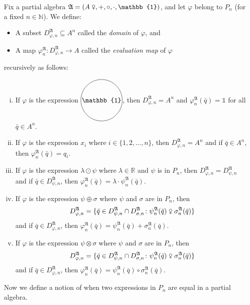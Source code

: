 \documentclass{scrartcl}
\renewcommand{\phi}{\varphi}
\newcommand{\FA}{\mathfrak{A}}
\newcommand{\BR}{\mathbb{R}}
\newcommand{\com}{\mathrel{\venus}}
\newcommand*\circled[1]{\tikz[baseline=(char.base)]{
  \node[shape=circle,draw,inner sep=1pt] (char) {#1};}}
\newcommand{\circone}{\circled{$\mathbb{1}$}}
\begin{document}
\begin{definition}
Fix a partial algebra $\FA=(A\com,+,\circ,\cdot,\mathbb{1})$, and let $\phi$ belong to $P_n$ (for a fixed $n\in\mathbb{N}$). We define:
\begin{itemize}
\item
A subset $D_{\phi,n}^{\FA}\subseteq A^n$ called  the \emph{domain} of $\phi$, and 
\item
A map $\phi_n^{\FA}:D_{\phi,n}^{\FA}\to A$ called the \emph{evaluation map} of $\phi$
\end{itemize}
 recursively as follows:
 
\begin{enumerate}[i)]

\item If $\phi$ is the expression $\circone$, then $D_{\phi,n}^{\FA}=A^n$ and $\phi_n^{\FA}(\bar{q})=\mathbb{1}$ for all $\bar{q}\in A^n$.

\item If $\phi$ is the expression $x_i$ where $i\in\{1,2,\ldots,n\}$, then $D_{\phi,n}^{\FA}=A^n$ and if $\bar{q}\in A^n$, then $\phi_n^{\FA}(\bar{q})=q_i$.

\item If $\phi$ is the expression $\lambda\odot\psi$ where $\lambda\in\BR$ and $\psi$ is in $P_n$, then $D_{\phi,n}^{\FA}=D_{\psi,n}^{\FA}$ and if $\bar{q}\in D_{\psi,n}^{\FA}$, then $\phi_n^{\FA}(\bar{q})=\lambda\cdot\psi_n^{\FA}(\bar{q})$.

\item If $\phi$ is the expression $\psi\oplus\sigma$ where $\psi$ and $\sigma$ are in $P_n$,  then 
\[
D_{\phi,n}^{\FA}=\{\bar{q}\in D_{\psi,n}^{\FA}\cap D_{\sigma,n}^{\FA}\colon\psi_n^{\FA}(\bar{q})\com\sigma_n^{\FA}(\bar{q})\}
\]
and if $\bar{q}\in D_{\phi,n}^{\FA}$, then $\phi_n^{\FA}(\bar{q})=\psi_n^{\FA}(\bar{q})+\sigma_n^{\FA}(\bar{q})$.

\item If $\phi$ is the expression $\psi\otimes\sigma$ where $\psi$ and $\sigma$ are in $P_n$,  then 
\[
D_{\phi,n}^{\FA}=\{\bar{q}\in D_{\psi,n}^{\FA}\cap D_{\sigma,n}^{\FA}\colon\psi_n^{\FA}(\bar{q})\com\sigma_n^{\FA}(\bar{q})\}
\]
and if $\bar{q}\in D_{\phi,n}^{\FA}$, then $\phi_n^{\FA}(\bar{q})=\psi_n^{\FA}(\bar{q})\circ\sigma_n^{\FA}(\bar{q})$.
\end{enumerate}
\end{definition}

Now we define a notion of when two expressions in $P_n$ are equal in a partial algebra.
\end{document}

